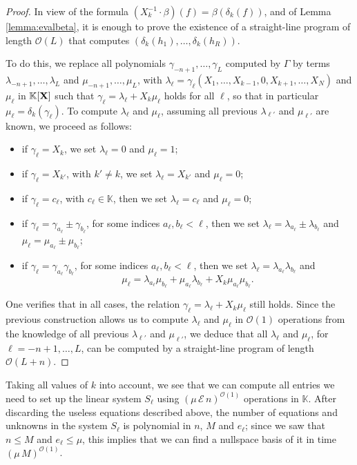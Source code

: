 \documentclass[11pt]{article}
\numberwithin{Property}{section}
\numberwithin{Theorem}{section}
\numberwithin{Proposition}{section}
\numberwithin{Lemma}{section}
\numberwithin{Corollary}{section}
\numberwithin{Definition}{section}
\numberwithin{Remark}{section}
\numberwithin{Conjecture}{section}
\numberwithin{Problem}{section}
\numberwithin{Claim}{section}
\theoremstyle{definition}
\numberwithin{Example}{section}
\renewcommand{\le}{\leqslant}
\newcommand{\bigO}[1]{\mathcal{O}(#1)} %
\renewcommand{\le}{\leqslant} %
\newcommand{\field}{\mathbb{K}} %
\newcommand{\mat}[1]{\mathbf{\MakeUppercase{#1}}} %
\begin{document}
\begin{proof} In view of the formula $(X_k^{-1} \cdot \beta)(f)=\beta(\delta_k(f))$, and of Lemma \ref{lemma:evalbeta}, it is enough to prove the existence of a straight-line program of length $\mathcal{O}(L)$ that computes $(\delta_k(h_1),\dots,\delta_k(h_R))$.

To do this, we replace all polynomials $\gamma_{-n+1},\dots,\gamma_L$ computed by $\Gamma$ by terms $\lambda_{-n+1},\dots,\lambda_L$ and $\mu_{-n+1},\dots,\mu_L$, with $\lambda_\ell=\gamma_\ell(X_1,\dots,X_{k-1},0,X_{k+1},\dots,X_N)$ and $\mu_\ell$ in $\field[\mat{X}]$ such that $\gamma_\ell= \lambda_\ell+X_k \mu_\ell$ holds for all $\ell$, so that in particular
  $\mu_\ell=\delta_k(\gamma_\ell)$.  To compute $\lambda_\ell$ and
  $\mu_\ell$, assuming all previous $\lambda_{\ell'}$ and
  $\mu_{\ell'}$ are known, we proceed as follows:
  \begin{itemize}
  \item if $\gamma_\ell=X_k$, we set $\lambda_\ell=0$ and $\mu_\ell=1$;
  \item if $\gamma_\ell=X_{k'}$, with $k' \ne k$, we set $\lambda_\ell=X_{k'}$ and $\mu_\ell=0$;
  \item if $\gamma_\ell =c_\ell$, with $c_\ell \in \field$,
    then we set $\lambda_\ell=c_\ell$ and  $\mu_\ell=0$;
  \item if $\gamma_\ell = \gamma_{a_\ell} \pm \gamma_{b_\ell}$,
    for some indices $a_\ell,b_\ell < \ell$, 
    then we set $\lambda_\ell=\lambda_{a_\ell}\pm\lambda_{b_\ell}$
    and $\mu_\ell=\mu_{a_\ell}\pm\mu_{b_\ell}$;
\item if $\gamma_\ell = \gamma_{a_\ell} \gamma_{b_\ell}$,
      for some indices $a_\ell,b_\ell < \ell$,
    then we set $\lambda_\ell=\lambda_{a_\ell} \lambda_{b_\ell}$
    and $$\mu_\ell=
\lambda_{a_\ell} \mu_{b_\ell}
+
\mu_{a_\ell} \lambda_{b_\ell}
+
X_k\mu_{a_\ell} \mu_{b_\ell}.$$
\end{itemize}
One verifies that in all cases, the relation $\gamma_\ell= \lambda_\ell+X_k \mu_\ell$ still holds. Since the previous construction allows us to compute $\lambda_\ell$ and $\mu_\ell$ in $\mathcal{O}(1)$ operations from the knowledge of all previous $\lambda_{\ell'}$ and $\mu_{\ell'}$, we deduce that all $\lambda_\ell$ and $\mu_\ell$,
for $\ell=-n+1,\dots,L$, can be computed by a straight-line program of length $\mathcal{O}(L+n)$.
\end{proof}

Taking all values of $k$ into account, we see that we can compute all entries we need to set up the linear system $S_\ell$ using $(\mu\,\mathcal{E}\,n)^{\bigO{1}}$ operations in $\field$. After discarding the useless equations described above, the number of equations and unknowns in the system $S_\ell$ is polynomial in $n$, $M$ and $e_\ell$; since we saw that $n \le M$ and $e_\ell \le \mu$, this implies that we can find a nullspace basis of it in time $(\mu\,M)^{\bigO{1}}$. 
\end{document}
